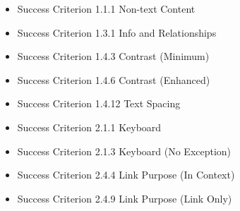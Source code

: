 \documentclass{master_thesis}
\begin{document}
\begin{itemize}
	\item Success Criterion 1.1.1 Non-text Content

	\item Success Criterion 1.3.1 Info and Relationships

	\item Success Criterion 1.4.3 Contrast (Minimum)
	\item Success Criterion 1.4.6 Contrast (Enhanced)

	\item Success Criterion 1.4.12 Text Spacing

	\item Success Criterion 2.1.1 Keyboard
	\item Success Criterion 2.1.3 Keyboard (No Exception)

	\item Success Criterion 2.4.4 Link Purpose (In Context)
	\item Success Criterion 2.4.9 Link Purpose (Link Only)


\end{itemize}
\end{document}

